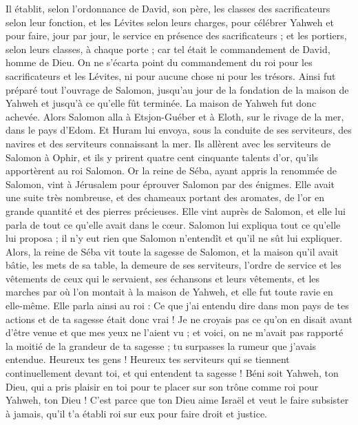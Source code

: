 \begin{multicols}{2}
Il établit, selon l'ordonnance de David, son père, les classes des sacrificateurs selon leur fonction, et les Lévites selon leurs charges, pour célébrer Yahweh et pour faire, jour par jour, le service en présence des sacrificateurs ; et les portiers, selon leurs classes, à chaque porte ; car tel était le commandement de David, homme de Dieu.
On ne s'écarta point du commandement du roi pour les sacrificateurs et les Lévites, ni pour aucune chose ni pour les trésors.
Ainsi fut préparé tout l'ouvrage de Salomon, jusqu'au jour de la fondation de la maison de Yahweh et jusqu'à ce qu'elle fût terminée. La maison de Yahweh fut donc achevée.
Alors Salomon alla à Etsjon-Guéber et à Eloth, sur le rivage de la mer, dans le pays d'Edom.
Et Huram lui envoya, sous la conduite de ses serviteurs, des navires et des serviteurs connaissant la mer. Ils allèrent avec les serviteurs de Salomon à Ophir, et ils y prirent quatre cent cinquante talents d'or, qu'ils apportèrent au roi Salomon.
\VerseOne{}Or la reine de Séba, ayant appris la renommée de Salomon, vint à Jérusalem pour éprouver Salomon par des énigmes. Elle avait une suite très nombreuse, et des chameaux portant des aromates, de l'or en grande quantité et des pierres précieuses. Elle vint auprès de Salomon, et elle lui parla de tout ce qu'elle avait dans le cœur.
Salomon lui expliqua tout ce qu’elle lui proposa ; il n'y eut rien que Salomon n'entendît et qu'il ne sût lui expliquer.
Alors, la reine de Séba vit toute la sagesse de Salomon, et la maison qu'il avait bâtie,
les mets de sa table, la demeure de ses serviteurs, l'ordre de service et les vêtements de ceux qui le servaient, ses échansons et leurs vêtements, et les marches par où l'on montait à la maison de Yahweh, et elle fut toute ravie en elle-même.
Elle parla ainsi au roi : Ce que j'ai entendu dire dans mon pays de tes actions et de ta sagesse était donc vrai !
Je ne croyais pas ce qu'on en disait avant d’être venue et que mes yeux ne l'aient vu ; et voici, on ne m'avait pas rapporté la moitié de la grandeur de ta sagesse ; tu surpasses la rumeur que j'avais entendue.
Heureux tes gens ! Heureux tes serviteurs qui se tiennent continuellement devant toi, et qui entendent ta sagesse !
Béni soit Yahweh, ton Dieu, qui a pris plaisir en toi pour te placer sur son trône comme roi pour Yahweh, ton Dieu ! C'est parce que ton Dieu aime Israël et veut le faire subsister à jamais, qu'il t'a établi roi sur eux pour faire droit et justice.

\end{multicols}

